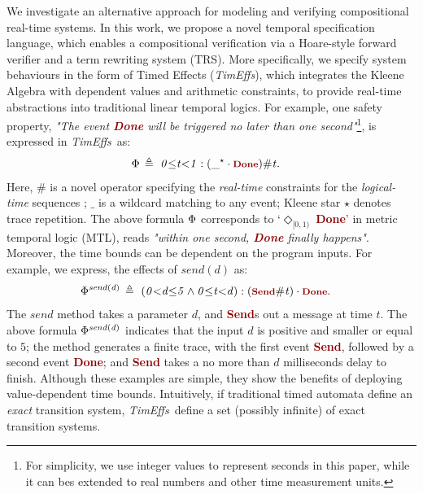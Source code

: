 \documentclass[acmsmall,10pt,review]{acmart}
\newcommand{\timedEffects}{\emph{TimEffs}}
\newcommand{\effect}{\textcolor{black}{\ensuremath{\mathrm{\Phi}}}}
\newcommand{\anyevent}[1]{{\textcolor{darkred}
{{\textbf{\footnotesize #1}}}}}
\newcommand{\code}[1]{{\tt{\ensuremath{\m{#1}}}}}
\newcommand{\m}{\mathit}
\def\defeq{\ensuremath{\,\triangleq}}
\begin{document}
We investigate an alternative approach for modeling and verifying 
compositional real-time systems. In this work, 
we propose a novel temporal specification language, 
which enables a compositional verification via a  Hoare-style 
forward verifier and a term rewriting system (TRS). 
More specifically, we specify system behaviours in the form of 
{Timed Effects} (\timedEffects), which integrates the Kleene Algebra with dependent values and arithmetic constraints, 
to 
provide real-time abstractions into traditional linear temporal logics. 
For example, one safety property, \textit{"The event \anyevent{Done} 
will be triggered no later than one second"}\footnote{For 
simplicity, we use integer values to represent seconds in this 
paper, while it can bes extended to real numbers and other 
time measurement units.}, is expressed in \timedEffects\ as: 
\begin{align*}
&\code{\effect \defeq \  0 {\leq} t {<}1 : ({\_^\star} \cdot \anyevent{Done} ) \# t}.
\end{align*}  
Here, \code{\#} is a novel operator specifying the \emph{real-time} 
constraints for the \emph{logical-time} sequences \cite{von2017real}; 
\code{\_} is a wildcard matching to any event; 
Kleene star \code{\star} denotes trace repetition.
The above formula \code{\effect} corresponds to `\code{\Diamond_{[0, 1)}\ }\anyevent{Done}' 
in metric temporal logic (MTL), reads \textit{"within one second, 
\anyevent{Done} finally happens"}. Moreover, the time bounds can be dependent on the program inputs. For example, we express, the effects of \code{send(d)} as:
\begin{align*}
&\code{\effect^{send (d)} \defeq \  (0 {<} d {\leq}5 \wedge  0 {\leq} t {<} d) : ({\anyevent{Send} \# t)} \cdot \anyevent{Done}}.
\end{align*}  
The \code{send} method takes a parameter \code{d}, and \anyevent{Send}s 
out a message at time \code{t}.  
The above formula  \code{\effect^{send (d)}} indicates that the 
input  \code{d} is positive and smaller or equal to \code{5}; the method 
generates a finite trace, with the first event \anyevent{Send}, followed by 
a second event \anyevent{Done}; and \anyevent{Send} takes a no more 
than \code{d} milliseconds delay to finish. 
Although these examples are simple, they show the benefits of deploying 
value-dependent 
time bounds. Intuitively, if traditional timed automata define an 
\emph{exact} transition system, \timedEffects\ define 
a set (possibly infinite) of exact transition systems. 
\end{document}

